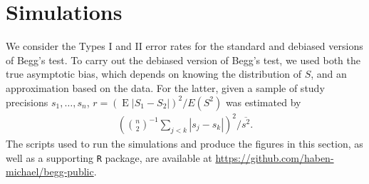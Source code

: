 \documentclass[12pt]{article}
\newcommand{\biasratio}{r}%
\newcommand{\s}{S}
\DeclareMathOperator{\E}{E}
\begin{document}
  
\section{Simulations}
\label{section:simulations}
  We consider the Types I and II error rates for the standard and 
  debiased versions of Begg's test. To carry out the debiased version
  of Begg's test, we used both the true asymptotic bias, which depends
  on knowing the distribution of $\s$, and an approximation based on the
  data. For the latter, given a sample of study precisions
  $s_1,\ldots,s_n$, $\biasratio=(\E|\s_1-\s_2|)^2/E(\s^2)$ was estimated
  by
    \begin{align}
      \left({n\choose 2}^{-1}\sum_{j<k}|s_j-s_k|\right)^2\bigg/ \overline{s^2}.
    \end{align}
    The scripts used to run the simulations and produce the figures in
    this section, as well as a supporting \texttt{R} package, are
    available at \url{https://github.com/haben-michael/begg-public}.
\end{document}
